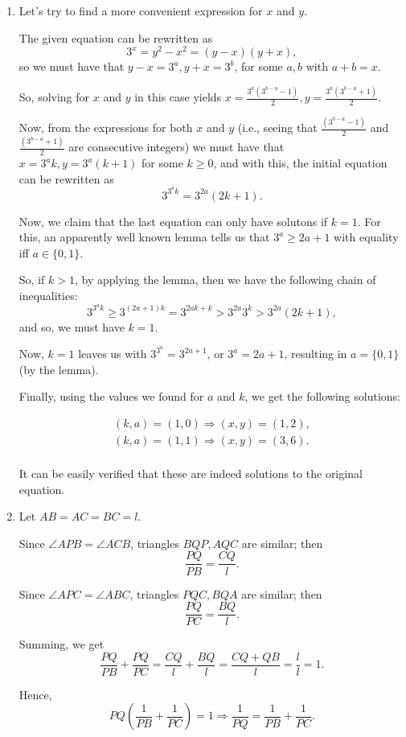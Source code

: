 \documentclass{article}
\begin{document}
\begin{enumerate}
\item Let's try to find a more convenient expression for $x$ and $y$.

The given equation can be rewritten as
$$
	3^x = y^2 - x^2 = (y - x)(y + x),
$$
so we must have that $ y - x = 3^a, y + x = 3^b$, for some $a, b$ with
$a + b = x.$

So, solving for $x$ and $y$ in this case yields
$x = \frac{3^a(3^{b - a} - 1)}{2}, y = \frac{3^a(3^{b - a} + 1)}{2}.$

Now, from the expressions for both $x$ and $y$ (i.e., seeing that
$\frac{(3^{b - a} - 1)}{2}$ and $\frac{(3^{b - a} + 1)}{2}$ are consecutive
integers) we must have that $x = 3^ak,y = 3^a(k + 1)$ for some $k \geq 0$, and
with this, the initial equation can be rewritten as
$$
	3^{3^ak} = 3^{2a}(2k + 1).
$$

Now, we claim that the last equation can only have solutons if $k = 1.$
For this, an apparently well known lemma tells us that $3^a \geq 2a + 1$ with
equality iff $a \in \{ 0, 1 \}$.

So, if $k > 1$, by applying the lemma, then we have the following chain
of inequalities:
$$
	3^{3^ak} \geq 3^{(2a + 1)k} = 3^{2ak + k} > 3^{2a} 3^k > 3^{2a}(2k + 1),
$$
and so, we must have $k = 1.$ 

Now, $k = 1$ leaves us with $3^{3^a} = 3^{2a + 1}$, or $3^a = 2a + 1$, resulting
in $a = \{ 0, 1 \}$ (by the lemma).

Finally, using the values we found for $a$ and $k$, we get the following solutions:

\begin{eqnarray*}
   (k, a) = (1, 0) \Rightarrow (x, y) = (1, 2),	\\
   (k, a) = (1, 1) \Rightarrow (x, y) = (3, 6). 	\\
\end{eqnarray*}

It can be easily verified that these are indeed solutions to the original equation.

\item Let $AB = AC = BC = l.$

Since $\angle APB = \angle ACB$, triangles $BQP, AQC$ are similar; then $$\frac{PQ}{PB} = \frac{CQ}{l}.$$

Since $\angle APC = \angle ABC$, triangles $PQC, BQA$ are similar; then $$\frac{PQ}{PC} = \frac{BQ}{l}.$$

Summing, we get $$\frac{PQ}{PB} + \frac{PQ}{PC} = \frac{CQ}{l} + \frac{BQ}{l} = \frac{CQ + QB}{l} = \frac{l}{l} = 1.$$

Hence, $$PQ\left(\frac{1}{PB} + \frac{1}{PC}\right) = 1 \Rightarrow \frac{1}{PQ} = \frac{1}{PB} + \frac{1}{PC}.$$

\end{enumerate}
\end{document}
